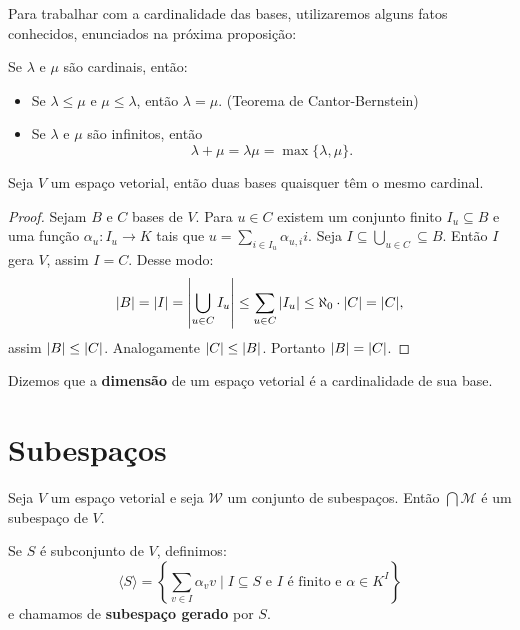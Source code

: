\documentclass[11pt,twoside,a4paper]{book}
\begin{document}
Para trabalhar com a cardinalidade das bases, utilizaremos alguns fatos
conhecidos, enunciados na próxima proposição:
\begin{proposicao}
Se $\lambda$ e $\mu$ são cardinais, então:
\begin{itemize}
\item Se $\lambda\leq\mu$ e $\mu\leq\lambda$, então $\lambda=\mu$. (Teorema de Cantor-Bernstein)
\item Se $\lambda$ e $\mu$ são infinitos, então \[\lambda+\mu=\lambda\mu=\max\{\lambda,\mu\}.\]
\end{itemize}
\end{proposicao}

\begin{teorema}
Seja $V$ um espaço vetorial, então duas bases quaisquer têm o mesmo cardinal.
\end{teorema}
\begin{proof}
Sejam $B$ e $C$ bases de $V$. Para $u\in C$ existem um conjunto finito $I_u\subseteq B$ e uma função $\alpha_u:I_u\rightarrow K$ tais que $u=\sum_{i\in I_u}\alpha_{u,i}i$. Seja $I\subseteq\bigcup_{u\in C}\subseteq B$. Então $I$ gera $V$, assim $I=C$. Desse modo:
\[
\abs{B}=\abs{I}=\abs{\bigcup_{u\in C}I_u}\leq\sum_{u\in C}\abs{I_u}\leq\aleph_0\cdot\abs{C}=\abs{C},
\]
assim $\abs{B}\leq\abs{C}$. Analogamente $\abs{C}\leq\abs{B}$. Portanto $\abs{B}=\abs{C}$.
\end{proof}
\begin{definicao}
Dizemos que a \textbf{dimensão} de um espaço vetorial é a cardinalidade de sua base.
\end{definicao}
\section{Subespaços}

\begin{proposicao}
Seja $V$ um espaço vetorial e seja $\mathcal{W}$ um conjunto de subespaços. Então $\bigcap\mathcal{M}$ é um subespaço de $V$.
\end{proposicao}

\begin{definicao}
Se $S$ é subconjunto de $V$, definimos:
\[
\langle S\rangle=\left\{\sum\limits_{v\in I}\alpha_vv\mid I\subseteq S\text{ e }I\text{ é finito e }\alpha\in K^I\right\}
\]
e chamamos de \textbf{subespaço gerado} por $S$.
\end{definicao}
\end{document}
